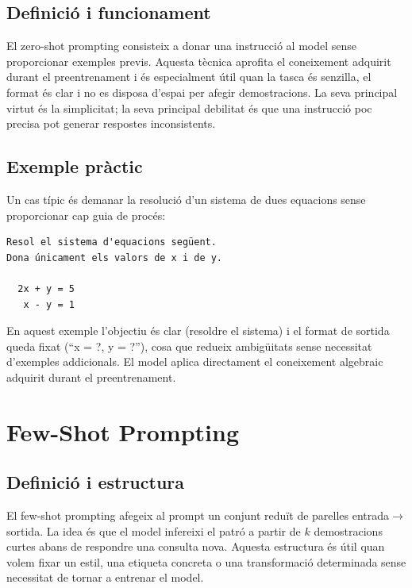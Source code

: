 \documentclass[12pt,a4paper]{report}
\begin{document}
\subsection{Definició i funcionament}
El zero-shot prompting consisteix a donar una instrucció al model sense proporcionar exemples previs. Aquesta tècnica aprofita el coneixement adquirit durant el preentrenament i és especialment útil quan la tasca és senzilla, el format és clar i no es disposa d'espai per afegir demostracions. La seva principal virtut és la simplicitat; la seva principal debilitat és que una instrucció poc precisa pot generar respostes inconsistents.

\subsection{Exemple pràctic}
Un cas típic és demanar la resolució d'un sistema de dues equacions sense proporcionar cap guia de procés:
\begin{verbatim}
Resol el sistema d'equacions següent.
Dona únicament els valors de x i de y.

  2x + y = 5
   x - y = 1
\end{verbatim}
En aquest exemple l'objectiu és clar (resoldre el sistema) i el format de sortida queda fixat (``x = ?, y = ?''), cosa que redueix ambigüitats sense necessitat d'exemples addicionals. El model aplica directament el coneixement algebraic adquirit durant el preentrenament.

\section{Few-Shot Prompting}

\subsection{Definició i estructura}
El few-shot prompting afegeix al prompt un conjunt reduït de parelles entrada$\rightarrow$sortida. La idea és que el model infereixi el patró a partir de \(k\) demostracions curtes abans de respondre una consulta nova. Aquesta estructura és útil quan volem fixar un estil, una etiqueta concreta o una transformació determinada sense necessitat de tornar a entrenar el model.
\end{document}
